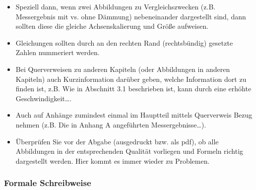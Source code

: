 \begin{itemize}
\newpage

    \item Speziell dann, wenn zwei Abbildungen zu Vergleichszwecken (z.B. Messergebnis mit vs. ohne Dämmung) nebeneinander dargestellt sind, dann sollten diese die gleiche Achsenskalierung und Größe aufweisen.
    \item Gleichungen sollten durch an den rechten Rand (rechtsbündig) gesetzte Zahlen nummeriert werden. 
    \item Bei Querverweisen zu anderen Kapiteln (oder Abbildungen in anderen Kapiteln) auch Kurzinformation darüber geben, welche Information dort zu finden ist, z.B. {\glqq}Wie in Abschnitt 3.1 beschrieben ist, kann durch eine erhöhte Geschwindigkeit…{\grqq}.
    \item Auch auf Anhänge zumindest einmal im Hauptteil mittels Querverweis Bezug nehmen
    (z.B. {\glqq}Die in Anhang A angeführten Messergebnisse…{\grqq}).
    \item Überprüfen Sie vor der Abgabe (ausgedruckt bzw. als pdf), ob alle Abbildungen in der entsprechenden Qualität vorliegen und Formeln richtig dargestellt werden. Hier kommt es immer wieder zu Problemen.
\end{itemize}


\subsubsection{Formale Schreibweise}
\label{sec: formale schreibweise}

